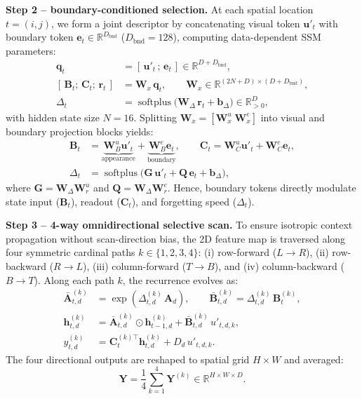 \documentclass[journal]{IEEEtran}
\newcommand{\R}{\mathbb{R}}
\newcommand{\vect}[1]{\bm{#1}}
\newcommand{\softplus}{\operatorname{softplus}}
\newcommand{\Dt}{\Delta}
\begin{document}
\textbf{Step 2 -- boundary-conditioned selection.} At each spatial location $t=(i,j)$, we form a joint descriptor by concatenating visual token $\vect{u}'_t$ with boundary token $\vect{e}_t\in\R^{D_{\text{bnd}}}$ ($D_{\text{bnd}}=128$), computing data-dependent SSM parameters:
\begin{align}
  \vect{q}_t &= [\,\vect{u}'_t\,;\,\vect{e}_t\,]\in\R^{D + D_{\text{bnd}}}, \label{eq:joint}\\
  [\,\vect{B}_t;\,\vect{C}_t;\,\vect{r}_t\,] &= \vect{W}_x\,\vect{q}_t,\qquad \vect{W}_x\in\R^{(2N+D)\times (D+D_{\text{bnd}})}, \label{eq:xproj}\\
  \Dt_t &= \softplus\big(\vect{W}_\Dt\,\vect{r}_t + \vect{b}_\Dt\big)\in\R^{D}_{>0}, \label{eq:delta}
\end{align}
with hidden state size $N=16$. Splitting $\vect{W}_x=[\vect{W}_x^{u}\;\vect{W}_x^{e}]$ into visual and boundary projection blocks yields:
\begin{equation}
  \begin{aligned}
  \vect{B}_t &= \underbrace{\vect{W}_B^{u}\vect{u}'_t}_{\text{appearance}} + \underbrace{\vect{W}_B^{e}\vect{e}_t}_{\text{boundary}}, \qquad
  \vect{C}_t = \vect{W}_C^{u}\vect{u}'_t + \vect{W}_C^{e}\vect{e}_t,\\
  \Dt_t &= \softplus\big(\vect{G}\,\vect{u}'_t + \vect{Q}\,\vect{e}_t + \vect{b}_\Dt\big),
  \end{aligned}
  \label{eq:split}
\end{equation}
where $\vect{G}=\vect{W}_\Dt\vect{W}_r^{u}$ and $\vect{Q}=\vect{W}_\Dt\vect{W}_r^{e}$. Hence, boundary tokens directly modulate state input ($\vect{B}_t$), readout ($\vect{C}_t$), and forgetting speed ($\Dt_t$).

\textbf{Step 3 -- 4-way omnidirectional selective scan.} To ensure isotropic context propagation without scan-direction bias, the 2D feature map is traversed along four symmetric cardinal paths $k\in\{1,2,3,4\}$: (i) row-forward ($L\to R$), (ii) row-backward ($R\to L$), (iii) column-forward ($T\to B$), and (iv) column-backward ($B\to T$). Along each path $k$, the recurrence evolves as:
\begin{align}
  \bar{\vect{A}}_{t,d}^{(k)} &= \exp(\Dt_{t,d}^{(k)}\,\vect{A}_d), \qquad \bar{\vect{B}}_{t,d}^{(k)}=\Dt_{t,d}^{(k)}\,\vect{B}_t^{(k)}, \label{eq:disc_bc}\\
  \vect{h}_{t,d}^{(k)} &= \bar{\vect{A}}_{t,d}^{(k)}\odot\vect{h}_{t-1,d}^{(k)} + \bar{\vect{B}}_{t,d}^{(k)}\,u'_{t,d,k}, \label{eq:scan_bc}\\
  y_{t,d}^{(k)} &= \vect{C}_t^{(k)\top}\vect{h}_{t,d}^{(k)} + D_d\,u'_{t,d,k}. \label{eq:out_bc}
\end{align}
The four directional outputs are reshaped to spatial grid $H\times W$ and averaged:
\begin{equation}
  \vect{Y} = \frac{1}{4}\sum_{k=1}^4 \vect{Y}^{(k)}\in\R^{H\times W\times D}.
  \label{eq:fused_scan}
\end{equation}
\end{document}
